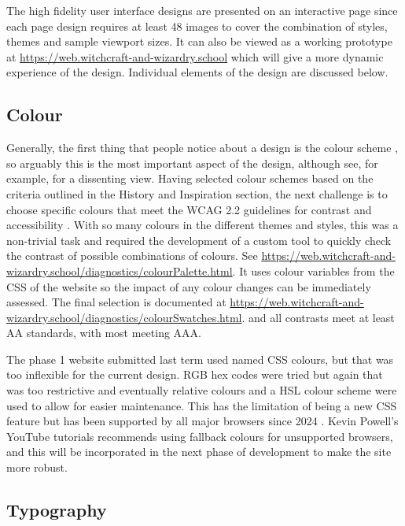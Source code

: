 \documentclass[a4paper, 12pt]{article}
\begin{document}
The high fidelity user interface designs are presented on an interactive page since each page design requires at least 48 images to cover the combination of styles, themes and sample viewport sizes. It can also be viewed as a working prototype at \url{https://web.witchcraft-and-wizardry.school} which will give a more dynamic experience of the design. Individual elements of the design are discussed below.

\subsection{Colour}
Generally, the first thing that people notice about a design is the colour scheme \citep{lindgaard2006attention}, so arguably this is the most important aspect of the design, although see, for example, \cite{tschichold1991new} for a dissenting view. Having selected colour schemes based on the criteria outlined in the History and Inspiration section, the next challenge is to choose specific colours that meet the WCAG 2.2 guidelines for contrast and accessibility \citep{caldwell2024}. With so many colours in the different themes and styles, this was a non-trivial task and required the development of a custom tool to quickly check the contrast of possible combinations of colours. See \url{https://web.witchcraft-and-wizardry.school/diagnostics/colourPalette.html}. It uses colour variables from the CSS of the website so the impact of any colour changes can be immediately assessed. The final selection is documented at \url{https://web.witchcraft-and-wizardry.school/diagnostics/colourSwatches.html}. and all contrasts meet at least AA standards, with most meeting AAA.

The phase 1 website submitted last term used named CSS colours, but that was too inflexible for the current design. RGB hex codes were tried but again that was too restrictive and eventually relative colours and a HSL colour scheme were used to allow for easier maintenance. This has the limitation of being a new CSS feature but has been supported by all major browsers since 2024 \citep{caniuse2026}. Kevin Powell's YouTube tutorials \citep{powell_youtube} recommends using fallback colours for unsupported browsers, and this will be incorporated in the next phase of development to make the site more robust.

\subsection{Typography}
\end{document}
